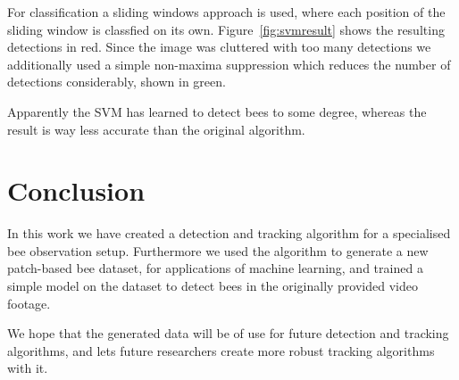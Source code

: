 \documentclass[10pt,a4paper]{article}
\begin{document}
For classification a sliding windows approach is used, where each position of the sliding window is classfied on its own. Figure~\ref{fig:svmresult} shows the resulting detections in red. Since the image was cluttered with too many detections we additionally used a simple non-maxima suppression which reduces the number of detections considerably, shown in green.

Apparently the SVM has learned to detect bees to some degree, whereas the result is way less accurate than the original algorithm. 

\section{Conclusion}
In this work we have created a detection and tracking algorithm for a specialised bee observation setup. Furthermore we used the algorithm to generate a new patch-based bee dataset, for applications of machine learning, and trained a simple model on the dataset to detect bees in the originally provided video footage.


We hope that the generated data will be of use for future detection and tracking algorithms, and lets future researchers create more robust tracking algorithms with it.



\end{document}
